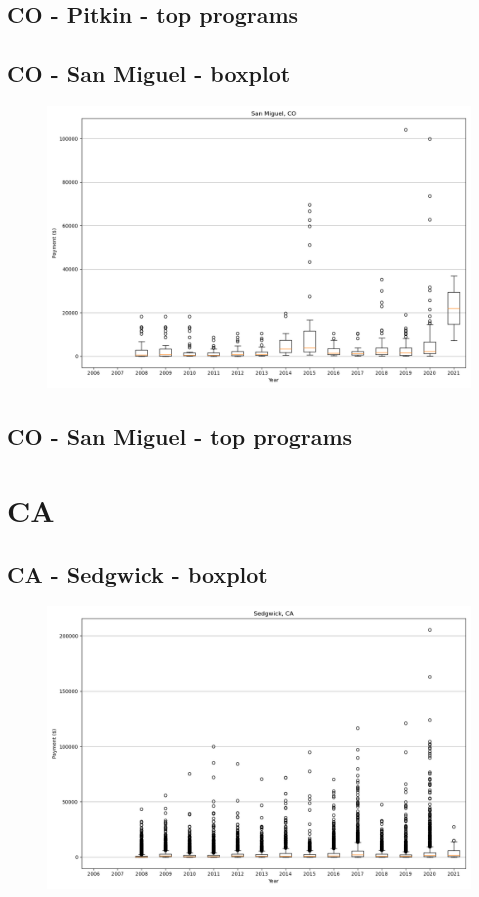 \subsection*{CO - Pitkin - top programs}

\newpage
\subsection*{CO - San Miguel - boxplot}
\begin{figure}[h]
\centering
\includegraphics[width=7in]{../output/boxplots/counties/San Miguel-CO_boxplot.png}
\end{figure}


\subsection*{CO - San Miguel - top programs}

\newpage
\section*{CA}
\subsection*{CA - Sedgwick - boxplot}
\begin{figure}[h]
\centering
\includegraphics[width=7in]{../output/boxplots/counties/Sedgwick-CA_boxplot.png}
\end{figure}


